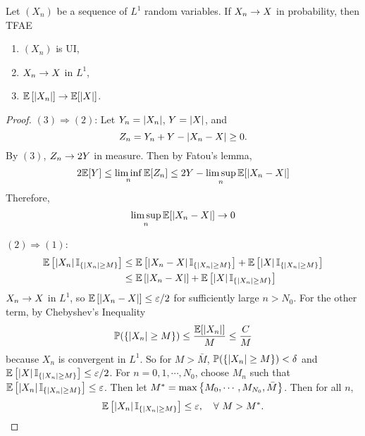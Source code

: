 \begin{thm}
    Let $(X_n)$ be a sequence of $L^1$ random variables. If $X_n \rightarrow X$ in probability, then TFAE
    \begin{enumerate}[label=(\arabic{*})]
        \item $(X_n)$ is UI,
        \item $X_n \rightarrow X$ in $L^1$,
        \item $\mathbb{E}\left[\left\lvert X_n\right\lvert\right] \rightarrow \mathbb{E}[\left\lvert X\right\lvert]$.
    \end{enumerate}
\end{thm}
\begin{proof}
    $(3) \Rightarrow (2)$: Let $Y_n = \left\lvert X_n\right\lvert$, $Y = \left\lvert X\right\lvert$, and 
    \begin{equation*}
        Z_n = Y_n + Y - \left\lvert X_n - X\right\lvert \geq 0.
    \end{equation*}
    By $(3)$, $Z_n \rightarrow 2Y$ in measure. Then by Fatou's lemma,
    \begin{equation*}
        2\mathbb{E}[Y] \leq \liminf_n \mathbb{E}[Z_n] \leq 2Y - \limsup_n\mathbb{E}[\left\lvert X_n - X\right\lvert]
    \end{equation*}
    Therefore,
    \begin{equation*}
        \limsup_n\mathbb{E}[\left\lvert X_n - X\right\lvert] \rightarrow 0
    \end{equation*}

    \noindent $(2) \Rightarrow (1)$: 
    \begin{equation*}
        \begin{aligned}
            \mathbb{E}\left[\left\lvert X_n\right\lvert\mathbb{I}_{\left\{\left\lvert X_n\right\lvert \geq M\right\}}\right] &\leq \mathbb{E}\left[\left\lvert X_n - X\right\lvert\mathbb{I}_{\left\{\left\lvert X_n\right\lvert \geq M\right\}}\right] + \mathbb{E}\left[\left\lvert X\right\lvert\mathbb{I}_{\left\{\left\lvert X_n\right\lvert \geq M\right\}}\right] \\
            &\leq \mathbb{E}\left[\left\lvert X_n - X\right\lvert\right] + \mathbb{E}\left[\left\lvert X\right\lvert\mathbb{I}_{\left\{\left\lvert X_n\right\lvert \geq M\right\}}\right] 
        \end{aligned}
    \end{equation*}
    $X_n \rightarrow X$ in $L^1$, so $\mathbb{E}\left[\left\lvert X_n - X\right\lvert\right] \leq \varepsilon / 2$ for sufficiently large $n > N_0$. For the other term, by Chebyshev's Inequality
    \begin{equation*}
        \mathbb{P}(\left\{\left\lvert X_n\right\lvert \geq M\right\}) \leq \frac{\mathbb{E}[\left\lvert X_n\right\lvert]}{M} \leq \frac{C}{M}
    \end{equation*}
    because $X_n$ is convergent in $L^1$. So for $M > \bar{M}$, $\mathbb{P}(\left\{\left\lvert X_n\right\lvert \geq M\right\}) < \delta$ and $\mathbb{E}\left[\left\lvert X\right\lvert\mathbb{I}_{\left\{\left\lvert X_n\right\lvert \geq M\right\}}\right] \leq \varepsilon / 2$. For $n = 0,1,\cdots,N_0$, choose $M_n$ such that $\mathbb{E}\left[\left\lvert X_n\right\lvert\mathbb{I}_{\left\{\left\lvert X_n\right\lvert \geq M\right\}}\right] \leq \varepsilon$. Then let $M^* = \max\left\{M_0,\cdots,M_{N_0},\bar{M}\right\}$. Then for all $n$,
    \begin{equation*}
        \mathbb{E}\left[\left\lvert X_n\right\lvert\mathbb{I}_{\left\{\left\lvert X_n\right\lvert \geq M\right\}}\right] \leq \varepsilon,\quad \forall~M > M^*.
    \end{equation*}


\end{proof}
